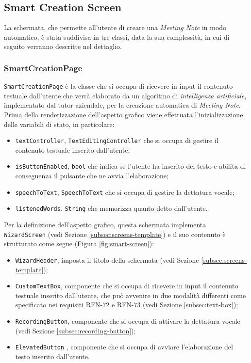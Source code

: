 \subsection{Smart Creation Screen}
\label{subsec:smart-creation-screen}

La schermata, che permette all'utente di creare una \emph{Meeting Note} in modo automatico, è stata suddivisa in tre classi, data la sua complessità, in cui di seguito verranno descritte nel dettaglio. 

\subsubsection*{SmartCreationPage}
\label{subsubsec:smart-creation-page}

\lstinline{SmartCreationPage} è la classe che si occupa di ricevere in input il contenuto testuale dall'utente che verrà elaborato da un algoritmo di \emph{intelligenza artificiale}, implementato dal tutor aziendale, per la creazione automatica di \emph{Meeting Note}. \\
Prima della renderizzazione dell'aspetto grafico viene effettuata l'inizializzazione delle variabili di stato, in particolare:
\begin{itemize}
    \item \lstinline{textController}, \lstinline{TextEditingController} \cite{site:text-editing-controller} che si occupa di gestire il contenuto testuale inserito dall'utente;
    \item \lstinline{isButtonEnabled}, \lstinline{bool} che indica se l'utente ha inserito del testo e abilita di conseguenza il pulsante che ne avvia l'elaborazione;
    \item \lstinline{speechToText}, \lstinline{SpeechToText} \cite{site:speech-to-text} che si occupa di gestire la dettatura vocale;
    \item \lstinline{listenedWords}, \lstinline{String} che memorizza quanto detto dall'utente.
\end{itemize}
Per la definizione dell'aspetto grafico, questa schermata implementa \lstinline{WizardScreen} (vedi Sezione \ref{subsec:screens-template}) e il suo contenuto è strutturato come segue (Figura \ref{fig:smart-screen}):
\begin{itemize}
    \item \lstinline{WizardHeader}, imposta il titolo della schermata (vedi Sezione \ref{subsec:screens-template});
    \item \lstinline{CustomTextBox}, componente che si occupa di ricevere in input il contenuto testuale inserito dall'utente, che può avvenire in due modalità differenti come specificato nei requisiti \hyperref[RFN-72]{RFN-72} e \hyperref[RFN-73]{RFN-73} (vedi Sezione \ref{subsec:text-box});
    \item \lstinline{RecordingButton}, componente che si occupa di attivare la dettatura vocale (vedi Sezione \ref{subsec:recording-button});
    \item \lstinline{ElevatedButton} \cite{site:elevated-button}, componente che si occupa di avviare l'elaborazione del testo inserito dall'utente.
\end{itemize}

